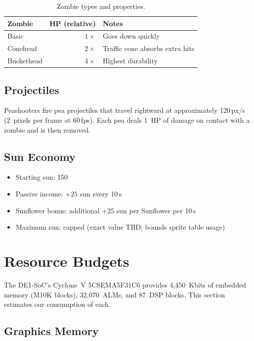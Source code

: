 \documentclass[11pt,letterpaper]{article}
\begin{document}
\begin{table}[H]
\centering
\caption{Zombie types and properties.}
\label{tab:zombies}
\begin{tabular}{l r l}
\toprule
\textbf{Zombie} & \textbf{HP (relative)} & \textbf{Notes} \\
\midrule
Basic      & $1\times$  & Goes down quickly \\
Conehead   & $2\times$  & Traffic cone absorbs extra hits \\
Buckethead & $4\times$  & Highest durability \\
\bottomrule
\end{tabular}
\end{table}

\subsection{Projectiles}

Peashooters fire pea projectiles that travel rightward at approximately
120\,px/s (2~pixels per frame at 60\,fps). Each pea deals 1~HP of
damage on contact with a zombie and is then removed.

\subsection{Sun Economy}

\begin{itemize}[nosep]
  \item Starting sun: 150
  \item Passive income: $+25$ sun every 10\,s
  \item Sunflower bonus: additional $+25$ sun per Sunflower per 10\,s
  \item Maximum sun: capped (exact value TBD; bounds sprite table usage)
\end{itemize}

\section{Resource Budgets}
\label{sec:resources}

The DE1-SoC's Cyclone~V 5CSEMA5F31C6 provides 4{,}450~Kbits of embedded
memory (M10K blocks), 32{,}070~ALMs, and 87~DSP blocks. This section
estimates our consumption of each.

\subsection{Graphics Memory}
\end{document}
